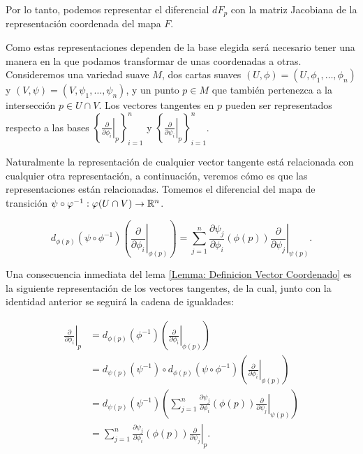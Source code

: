 Por lo tanto, podemos representar el diferencial $dF_p$ con la matriz Jacobiana de la representación coordenada del mapa $F$.

Como estas representaciones dependen de la base elegida será necesario tener una manera en la que podamos transformar de unas coordenadas a otras. Consideremos una variedad suave $M$, dos cartas suaves $(U,\phi)=(U,\phi_1,\dots,\phi_n)$ y $(V,\psi)=(V,\psi_1,\dots,\psi_n)$, y un punto $p \in M$ que también pertenezca a la intersección $p \in U \cap V$. Los vectores tangentes en $p$ pueden ser representados respecto a las bases $\left\{\left. \frac{\partial}{\partial \phi_i} \right|_{p}\right\}_{i=1}^{n}$ y $\left\{\left. \frac{\partial}{\partial \psi_i} \right|_{p}\right\}_{i=1}^{n}$.

Naturalmente la representación de cualquier vector tangente está relacionada con cualquier otra representación, a continuación, veremos cómo es que las representaciones están relacionadas. Tomemos el diferencial del mapa de transición $\psi \circ \varphi^{-1}: \varphi(U \cap V) \to \mathbb{R}^n$.

\[
	d_{\phi(p)}(\psi \circ \phi^{-1}) \left( \left. \frac{\partial}{\partial \phi_{i}} \right|_{\phi(p)} \right) = \sum_{j=1}^{n}\frac{\partial \psi_j}{\partial \phi_i} (\phi(p)) \left. \frac{\partial}{\partial \psi_{j}} \right|_{\psi(p)}.
\]

Una consecuencia inmediata del lema \ref{Lemma: Definicion Vector Coordenado} es la siguiente representación de los vectores tangentes, de la cual, junto con la identidad anterior se seguirá la cadena de igualdades:

\begin{align*}
	\left. \frac{\partial}{\partial \phi_i}\right|_{p}
	 & =
	d_{\phi(p)} \left(\phi^{-1}\right)
	\left(\left.
	\frac{\partial}{\partial \phi_i}
	\right|_{\phi(p)}\right)                                            \\
	 & =
	d_{\psi(p)}(\psi^{-1}) \circ d_{\phi(p)}\left(\psi \circ \phi^{-1}\right)
	\left( \left.
	\frac{\partial}{\partial \phi_i}
	\right|_{\phi(p)}\right)                                            \\
	 & =
	d_{\psi(p)}(\psi^{-1}) \left(
	\sum_{j=1}^{n}\frac{\partial \psi_j}{\partial \phi_i}(\phi(p))
	\left.
	\frac{\partial}{\partial \psi_j}
	\right|_{\psi(p)} \right)                                           \\
	 & = \sum_{j=1}^{n}\frac{\partial \psi_j}{\partial \phi_i}(\phi(p))
	\left.
	\frac{\partial}{\partial \psi_j}
	\right|_{p}.
\end{align*}

